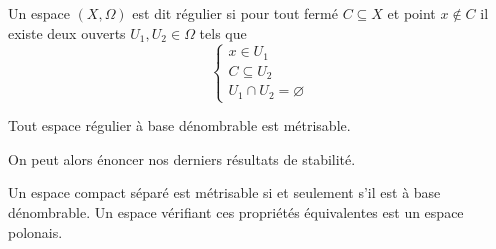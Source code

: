 \begin{definition}
  Un espace $(X,\Omega)$ est dit régulier si pour tout fermé $C\subseteq X$ et
  point $x\notin C$ il existe deux ouverts $U_1,U_2\in\Omega$ tels que
  \[\left\{
  \begin{array}{l}
    x\in U_1\\
    C\subseteq U_2\\
    U_1\cap U_2 = \varnothing
  \end{array}
  \right.\]
\end{definition}

\begin{theorem}\label{desc.thm.urysohn}
  Tout espace régulier à base dénombrable est métrisable.
\end{theorem}

On peut alors énoncer nos derniers résultats de stabilité.

\begin{proposition}\label{desc.prop.second}
  Un espace compact séparé est métrisable si et seulement s'il est à base
  dénombrable. Un espace vérifiant ces propriétés équivalentes est un espace
  polonais.
\end{proposition}

